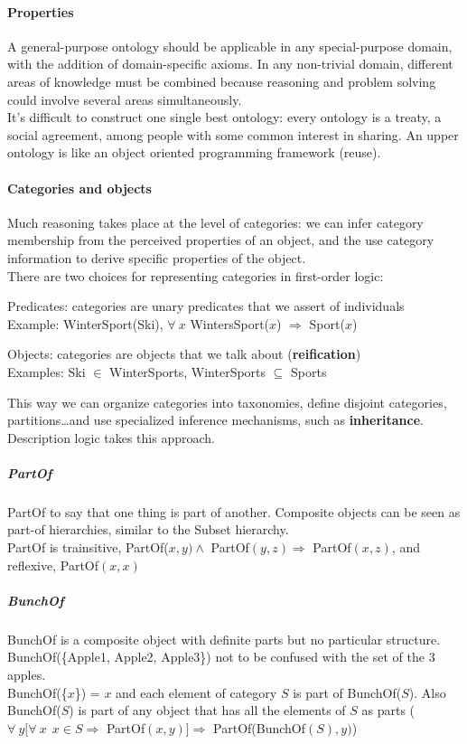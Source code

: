 \documentclass[10pt]{report}
\begin{document}
\paragraph{Properties} A general-purpose ontology should be applicable in any special-purpose domain, with the addition of domain-specific axioms. In any non-trivial domain, different areas of knowledge must be combined because reasoning and problem solving could involve several areas simultaneously.\\
It's difficult to construct one single best ontology: every ontology is a treaty, a social agreement, among people with some common interest in sharing. An upper ontology is like an object oriented programming framework (reuse).
\paragraph{Categories and objects} Much reasoning takes place at the level of categories: we can infer category membership from the perceived properties of an object, and the use category information to derive specific properties of the object.\\
There are two choices for representing categories in first-order logic:
\begin{list}{}{}
	\item Predicates: categories are unary predicates that we assert of individuals\\
	Example: WinterSport(Ski), $\forall\:x$ WintersSport($x$) $\Rightarrow$ Sport($x$)
	\item Objects: categories are objects that we talk about (\textbf{reification})\\
	Examples: Ski $\in$ WinterSports, WinterSports $\subseteq$ Sports
\end{list}
This way we can organize categories into taxonomies, define disjoint categories, partitions\ldots and use specialized inference mechanisms, such as \textbf{inheritance}. Description logic takes this approach.
\subparagraph{PartOf} PartOf to say that one thing is part of another. Composite objects can be seen as part-of hierarchies, similar to the Subset hierarchy.\\
PartOf is trainsitive, PartOf($x,y)\wedge$ PartOf$(y,z)\Rightarrow$ PartOf$(x,z)$, and reflexive, PartOf$(x,x)$
\subparagraph{BunchOf} BunchOf is a composite object with definite parts but no particular structure. BunchOf(\{Apple1, Apple2, Apple3\}) not to be confused with the set of the 3 apples.\\
BunchOf(\{$x$\}) = $x$ and each element of category $S$ is part of BunchOf($S$). Also BunchOf($S$) is part of any object that has all the elements of $S$ as parts ($\forall\:y[\forall\:x\:\:x\in S\Rightarrow$ PartOf$(x,y)]\Rightarrow$ PartOf(BunchOf$(S),y)$)
\end{document}
